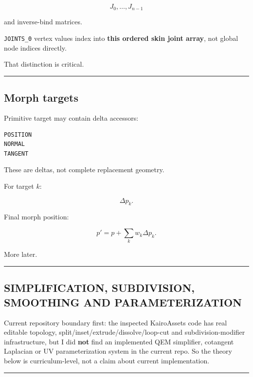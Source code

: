 \[
J_0,\dots,J_{n-1}
\]

and inverse-bind matrices.

\texttt{JOINTS\_0} vertex values index into \textbf{this ordered skin joint array}, not global node indices directly.

That distinction is critical.

\begin{center}\rule{0.5\linewidth}{0.5pt}\end{center}

\subsection{Morph targets}\label{04-visual-computing-ii-ch041-morph-targets}

Primitive target may contain delta accessors:

\begin{verbatim}
POSITION
NORMAL
TANGENT
\end{verbatim}

These are deltas, not complete replacement geometry.

For target \(k\):

\[
\Delta p_k.
\]

Final morph position:

\[
p'=p+\sum_k w_k\Delta p_k.
\]

More later.

\begin{center}\rule{0.5\linewidth}{0.5pt}\end{center}

\subsection{SIMPLIFICATION, SUBDIVISION, SMOOTHING AND PARAMETERIZATION}\label{04-visual-computing-ii-ch041-simplification-subdivision-smoothing-and-parameterization}

Current repository boundary first: the inspected KairoAssets code has real editable topology, split/inset/extrude/dissolve/loop-cut and subdivision-modifier infrastructure, but I did \textbf{not} find an implemented QEM simplifier, cotangent Laplacian or UV parameterization system in the current repo. So the theory below is curriculum-level, not a claim about current implementation.

\begin{center}\rule{0.5\linewidth}{0.5pt}\end{center}

